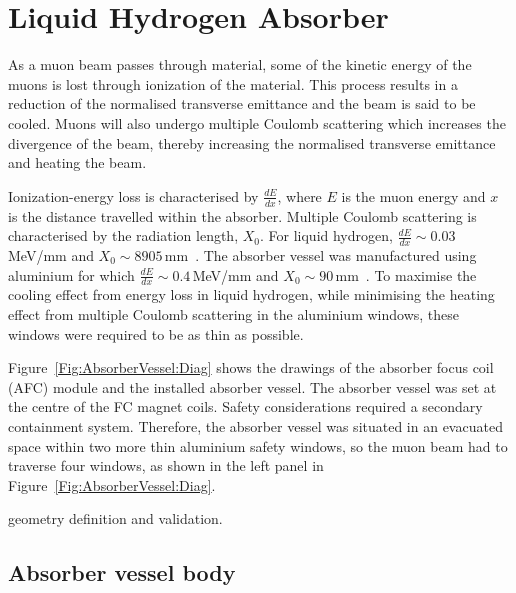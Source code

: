 \graphicspath{{11-Absorber/Figures/}}

\section{Liquid Hydrogen Absorber}
\label{Sect:Absorber}
As a muon beam passes through material, some of the kinetic energy
of the muons is lost through ionization of the material.
This process results in a reduction of the normalised
transverse emittance and the beam is said to be cooled.
Muons will also undergo multiple Coulomb scattering which
increases the divergence of the beam, thereby
increasing the normalised transverse emittance and heating the beam.

Ionization-energy loss is characterised by $\frac{dE}{dx}$, where $E$
is the muon energy and $x$ is the distance travelled within the
absorber.
Multiple Coulomb scattering is characterised by the radiation length,
$X_0$.
For liquid hydrogen, $\frac{dE}{dx} \sim 0.03$\,MeV/mm and $X_0 \sim
8905$\,mm~\cite{PhysRevD.98.030001}.
The absorber vessel was manufactured using aluminium for which
$\frac{dE}{dx} \sim 0.4$\,MeV/mm and $X_0\sim
90$\,mm~\cite{PhysRevD.98.030001}.
To maximise the cooling effect from energy loss in liquid hydrogen,
while minimising the heating effect from multiple Coulomb scattering
in the aluminium windows, these windows were required to be as thin as possible.

Figure~\ref{Fig:AbsorberVessel:Diag} shows the drawings of the absorber focus coil (AFC) module and the installed absorber vessel. The absorber vessel was set at the centre of the FC magnet coils.  Safety considerations required a secondary containment system. Therefore, the absorber vessel was situated in an evacuated space within two more thin aluminium safety windows, so the muon beam had to traverse four windows, as shown in the left panel in Figure~\ref{Fig:AbsorberVessel:Diag}.

geometry definition and validation.

\subsection{Absorber vessel body}
\label{SubSect:AbsorberVessel:Body}


